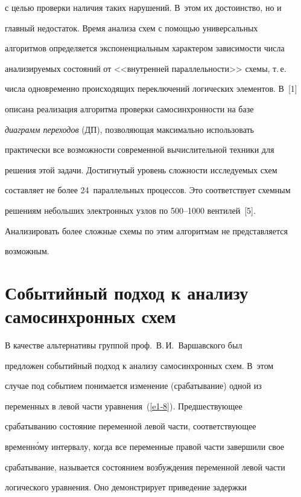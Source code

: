 с целью проверки наличия таких нарушений. В~этом их достоинство, но и 


главный недостаток. Время анализа схем с помощью универсальных 


алгоритмов определяется экспоненциальным характером зависимости числа 


анализируемых состояний от <<внутренней параллельности>> схемы, т.\,е.\ 


числа одновременно происходящих переключений логических элементов. В~[1] 


описана реализация алгоритма проверки самосинхронности на базе 


\textit{диаграмм переходов} (ДП), позволяющая максимально использовать 


практически все возможности современной вычислительной техники для 


решения этой задачи. Достигнутый уровень сложности исследуемых схем 


составляет не более 24~параллельных процессов. Это соответствует схемным 


решениям небольших электронных узлов по 500--1000 вентилей~[5]. 


Анализировать более сложные схемы по этим алгоритмам не представляется 


возможным.





\section{Событийный подход к анализу самосинхронных схем}





      В качестве альтернативы группой проф.\ В.\,И.~Варшавского был 


предложен событийный подход к анализу самосинхронных схем. В~этом 


случае под событием понимается изменение (срабатывание) одной из 


переменных в левой час\-ти уравнения~(\ref{e1-8}). Предшествующее 


срабатыванию состояние переменной левой час\-ти, соответствующее 


временн\'{о}му интервалу, когда все переменные правой части завершили свое 


срабатывание, называется состоянием возбуждения переменной левой час\-ти 


логического уравнения. Оно демонстрирует приведение задержки 


